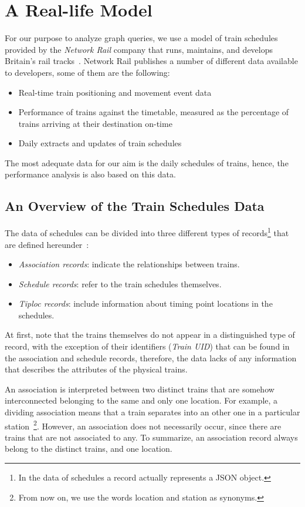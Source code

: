 \section{A Real-life Model}

For our purpose to analyze graph queries, we use a model of train schedules provided by the \textit{Network Rail} company that runs, maintains, and develops Britain's rail tracks~\cite{network_rail}. Network Rail publishes a number of different data available to developers, some of them are the following:
\begin{itemize}
	\item{Real-time train positioning and movement event data}
	\item{Performance of trains against the timetable, measured as the percentage of trains arriving at their destination on-time}
	\item{Daily extracts and updates of train schedules}
\end{itemize}

The most adequate data for our aim is the daily schedules of trains, hence, the performance analysis is also based on this data.

\subsection{An Overview of the Train Schedules Data}\label{sec:schedules_overview}
The data of schedules can be divided into three different types of records\footnote{In the data of schedules a record actually represents a JSON object.} that are defined hereunder~\cite{schedules_data}:
\begin{itemize}
	\item{\textit{Association records}}: indicate the relationships between trains.
	\item{\textit{Schedule records}}: refer to the train schedules themselves.
	\item{\textit{Tiploc records}}: include information about timing point locations in the schedules.
\end{itemize}

At first, note that the trains themselves do not appear in a distinguished type of record, with the exception of their identifiers (\textit{Train UID}) that can be found in the association and schedule records, therefore, the data lacks of any information that describes the attributes of the physical trains.

An association is interpreted between two distinct trains that are somehow interconnected belonging to the same and only one location. For example, a dividing association means that a train separates into an other one in a particular station~\footnote{From now on, we use the words location and station as synonyms.}. However, an association does not necessarily occur, since there are trains that are not associated to any. To summarize, an association record always belong to the distinct trains, and one location.


